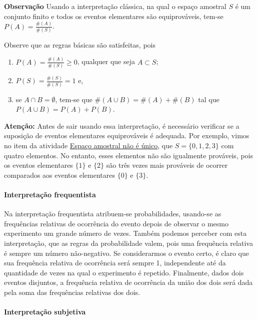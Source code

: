 \begin{observation}

\textbf{Observação} Usando a interpretação clássica, na qual o espaço amostral \(S\) é um conjunto finito e todos os eventos elementares são equiprováveis, tem-se \(P(A)=\frac{\#(A)}{\#(S)}\).

Observe que as regras básicas são satisfeitas, pois
\begin{enumerate}
\item {} 
\(P(A)=\displaystyle{\frac{\#(A)}{\#(S)}}\geq 0\), qualquer que seja \(A \subset S\);

\item {} 
\(P(S)=\displaystyle{\frac{\#(S)}{\#(S)}=1}\) e,

\item {} 
se \(A\cap B=\emptyset\), tem-se que \(\#(A\cup B)=\#(A)+\#(B)\) tal que \(P(A\cup B)=P(A)+P(B)\).

\end{enumerate}

\textbf{Atenção:} Antes de sair usando essa interpretação, é necessário verificar se a suposição de eventos elementares equiprováveis é adequada. Por exemplo, vimos no item  da atividade \hyperref[espaço-nao-unico]{Espaço amostral não é único}, que \(S=\{0,1,2,3\}\) com quatro elementos. No entanto, esses elementos não são igualmente prováveis, pois os eventos elementares \(\{1\}\) e \(\{ 2\}\) são três vezes mais prováveis de ocorrer comparados aos eventos elementares \(\{0\}\) e \(\{3\}\).
\end{observation}

\paragraph{Interpretação frequentista}

Na interpretação frequentista atribuem-se probabilidades, usando-se as frequências relativas de ocorrência do evento depois de observar o mesmo experimento um grande número de vezes. Também podemos perceber com esta interpretação, que as regras da probabilidade valem, pois uma frequência relativa é sempre um número não-negativo. Se considerarmos o evento certo, é claro que sua frequência relativa de ocorrência será sempre 1, independente até da quantidade de vezes na qual o experimento é repetido. Finalmente, dados dois eventos disjuntos, a frequência relativa de ocorrência da união dos dois será dada pela soma das frequências relativas dos dois.

\paragraph{Interpretação subjetiva}

